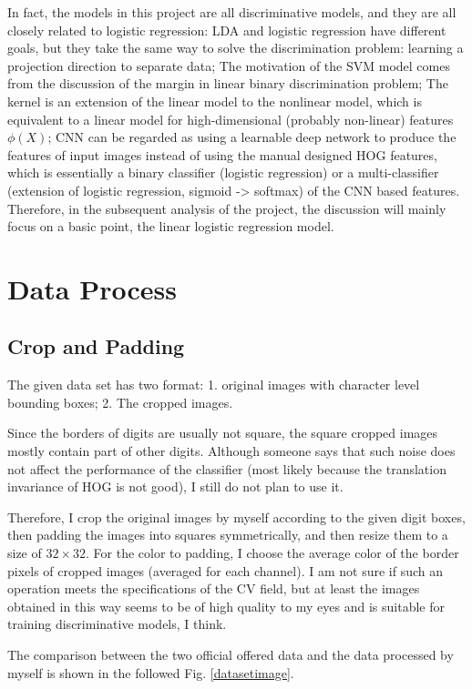 \documentclass{article}
\begin{document}
In fact, the models in this project are all discriminative models, and they are all closely related to logistic regression: LDA and logistic regression have different goals, but they take the same way to solve 
the discrimination problem: learning a projection direction to separate data; The motivation of the SVM model comes from the discussion of the margin in linear binary discrimination problem; The kernel is an extension 
of the linear model to the nonlinear model, which is equivalent to a linear model for high-dimensional (probably non-linear) features $\phi(X)$; CNN can be regarded as using a learnable deep network to produce the features 
of input images instead of using the manual designed HOG features, which is essentially a binary classifier (logistic regression) or a multi-classifier (extension of logistic regression, sigmoid -> softmax) of the CNN based features. 
Therefore, in the subsequent analysis of the project, the discussion will mainly focus on a basic point, the linear logistic regression model. 

\section{Data Process}
\subsection{Crop and Padding}
The given data set has two format: 1. original images with character level bounding boxes; 2. The cropped images. 

Since the borders of digits are usually not square, the square cropped images mostly contain part of other digits. Although someone says 
that such noise does not affect the performance of the classifier (most likely because the translation invariance of HOG is not good), I still do not plan to use it. 

Therefore, I crop the original images by myself according to the given digit boxes, then padding the images into squares symmetrically, and then resize them to a size of $32\times 32$.
For the color to padding, I choose the average color of the border pixels of cropped images (averaged for each channel). I am not sure if such an operation meets the specifications of the CV field, 
but at least the images obtained in this way seems to be of high quality to my eyes and is suitable for training discriminative models, I think.

The comparison between the two official offered data and the data processed by myself is shown in the followed Fig. \ref{datasetimage}.
\end{document}
